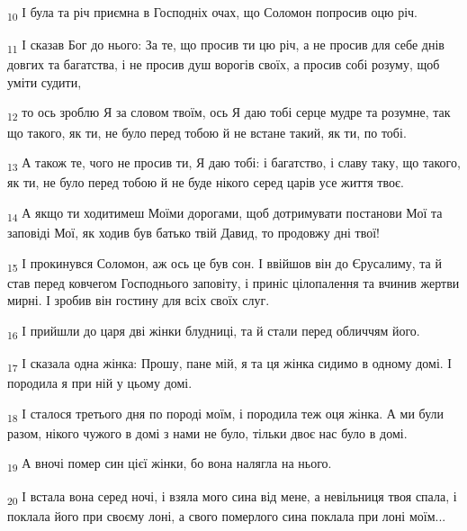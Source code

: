 \begin{tcolorbox}
\textsubscript{10} І була та річ приємна в Господніх очах, що Соломон попросив оцю річ.
\end{tcolorbox}
\begin{tcolorbox}
\textsubscript{11} І сказав Бог до нього: За те, що просив ти цю річ, а не просив для себе днів довгих та багатства, і не просив душ ворогів своїх, а просив собі розуму, щоб уміти судити,
\end{tcolorbox}
\begin{tcolorbox}
\textsubscript{12} то ось зроблю Я за словом твоїм, ось Я даю тобі серце мудре та розумне, так що такого, як ти, не було перед тобою й не встане такий, як ти, по тобі.
\end{tcolorbox}
\begin{tcolorbox}
\textsubscript{13} А також те, чого не просив ти, Я даю тобі: і багатство, і славу таку, що такого, як ти, не було перед тобою й не буде нікого серед царів усе життя твоє.
\end{tcolorbox}
\begin{tcolorbox}
\textsubscript{14} А якщо ти ходитимеш Моїми дорогами, щоб дотримувати постанови Мої та заповіді Мої, як ходив був батько твій Давид, то продовжу дні твої!
\end{tcolorbox}
\begin{tcolorbox}
\textsubscript{15} І прокинувся Соломон, аж ось це був сон. І ввійшов він до Єрусалиму, та й став перед ковчегом Господнього заповіту, і приніс цілопалення та вчинив жертви мирні. І зробив він гостину для всіх своїх слуг.
\end{tcolorbox}
\begin{tcolorbox}
\textsubscript{16} І прийшли до царя дві жінки блудниці, та й стали перед обличчям його.
\end{tcolorbox}
\begin{tcolorbox}
\textsubscript{17} І сказала одна жінка: Прошу, пане мій, я та ця жінка сидимо в одному домі. І породила я при ній у цьому домі.
\end{tcolorbox}
\begin{tcolorbox}
\textsubscript{18} І сталося третього дня по породі моїм, і породила теж оця жінка. А ми були разом, нікого чужого в домі з нами не було, тільки двоє нас було в домі.
\end{tcolorbox}
\begin{tcolorbox}
\textsubscript{19} А вночі помер син цієї жінки, бо вона налягла на нього.
\end{tcolorbox}
\begin{tcolorbox}
\textsubscript{20} І встала вона серед ночі, і взяла мого сина від мене, а невільниця твоя спала, і поклала його при своєму лоні, а свого померлого сина поклала при лоні моїм...
\end{tcolorbox}
